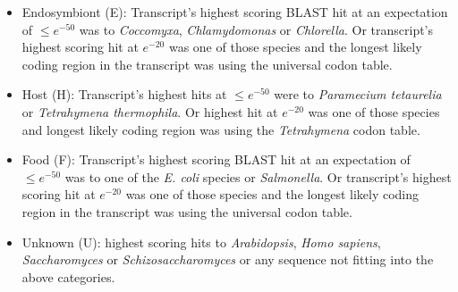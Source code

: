 \begin{itemize}
    \item Endosymbiont (E): Transcript’s highest scoring BLAST hit at an expectation of \(\leq e^{-50}\) was to \textit{Coccomyxa},
        \textit{Chlamydomonas} or \textit{Chlorella}. Or transcript’s highest scoring hit at \(e^{-20}\) was one of those
species and the longest likely coding region in the transcript was using the universal codon
table.
\item Host (H): Transcript’s highest hits at \(\leq e^{-50}\) were to \textit{Paramecium tetaurelia} or \textit{Tetrahymena
        thermophila}. Or highest hit at \(e^{-20}\) was one of those species and longest likely coding
    region was using the \textit{Tetrahymena} codon table.
\item Food (F): Transcript’s highest scoring BLAST hit at an expectation of \(\leq e^{-50}\) was to one of the \textit{E. coli} species
    or \textit{Salmonella}. Or transcript’s highest scoring hit at \(e^{-20}\) was one of those species and
the longest likely coding region in the transcript was using the universal codon table.
\item Unknown (U): highest scoring hits to \textit{Arabidopsis}, \textit{Homo sapiens}, \textit{Saccharomyces} or \textit{Schizosaccharomyces} 
    or any sequence not fitting into the above categories.
\end{itemize}

